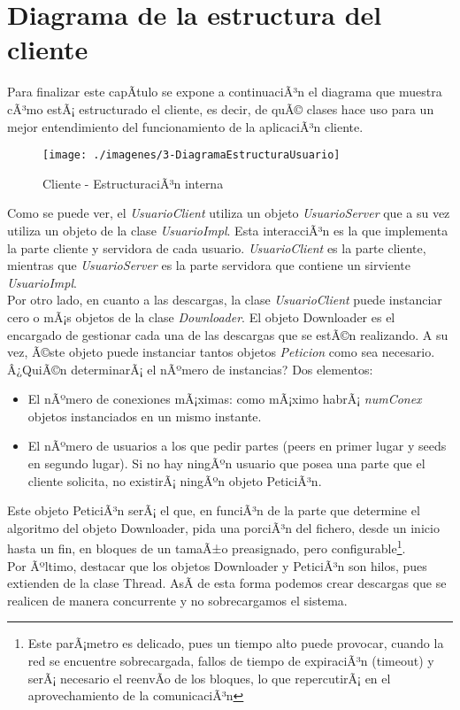    \section{Diagrama de la estructura del cliente}
   Para finalizar este capÃ­tulo se expone a continuaciÃ³n el diagrama que muestra cÃ³mo estÃ¡ estructurado el cliente, es decir, de quÃ©
   clases hace uso para un mejor entendimiento del funcionamiento de la aplicaciÃ³n cliente.\\
  \begin{figure} [H] \begin{center}
    \texttt{[image: ./imagenes/3-DiagramaEstructuraUsuario]}
    \caption{Cliente - EstructuraciÃ³n interna} \label{DEU}
  \end{center} \end{figure}
   Como se puede ver, el \textit{UsuarioClient} utiliza un objeto \textit{UsuarioServer} que a su vez utiliza un objeto de la clase 
   \textit{UsuarioImpl}. Esta interacciÃ³n es la que implementa la parte cliente y servidora de cada usuario. \textit{UsuarioClient} es la parte
  cliente, mientras que \textit{UsuarioServer} es la parte servidora que contiene un sirviente \textit{UsuarioImpl}.\\

   Por otro lado, en cuanto a las descargas, la clase \textit{UsuarioClient} puede instanciar cero o mÃ¡s objetos de la clase \textit{Downloader}.
   El objeto Downloader es el encargado de gestionar cada una de las descargas que se estÃ©n realizando. A su vez, Ã©ste objeto puede instanciar
   tantos objetos \textit{Peticion} como sea necesario. Â¿QuiÃ©n determinarÃ¡ el nÃºmero de instancias? Dos elementos:
   \begin{itemize}
    \item El nÃºmero de conexiones mÃ¡ximas: como mÃ¡ximo habrÃ¡ \textit{numConex} objetos instanciados en un mismo instante.
    \item El nÃºmero de usuarios a los que pedir partes (peers en primer lugar y seeds en segundo lugar). Si no hay ningÃºn usuario que posea una parte
          que el cliente solicita, no existirÃ¡ ningÃºn objeto PeticiÃ³n.\\
   \end{itemize}

   Este objeto PeticiÃ³n serÃ¡ el que, en funciÃ³n de la parte que determine el algoritmo del objeto Downloader, pida una porciÃ³n del fichero, desde un
   inicio hasta un fin, en bloques de un tamaÃ±o preasignado, pero configurable\footnote{Este parÃ¡metro es delicado, pues un tiempo alto puede provocar,
   cuando la red se encuentre sobrecargada, fallos de tiempo de expiraciÃ³n (timeout) y serÃ¡ necesario el reenvÃ­o de los bloques, lo que repercutirÃ¡ en
   el aprovechamiento de la comunicaciÃ³n}.\\

   Por Ãºltimo, destacar que los objetos Downloader y PeticiÃ³n son hilos, pues extienden de la clase Thread. AsÃ­ de esta forma podemos crear descargas
   que se realicen de manera concurrente y no sobrecargamos el sistema.

